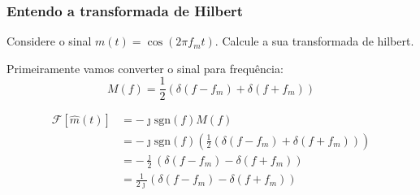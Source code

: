 \documentclass[10pt,hyperref={pdfpagemode=FullScreen},aspectratio=169]{beamer}
\begin{document}
\begin{frame}
  \frametitle{Entendo a transformada de Hilbert
  }
  Considere o sinal $m(t) = \cos \left(2\pi f_m t\right)$. Calcule a sua transformada de hilbert.

  Primeiramente vamos converter o sinal para frequência:
    $$
    M(f) = \frac{1}{2}\left(\delta (f - f_m) + \delta (f + f_m) \right)
    $$
  
    
    \begin{align*}
      \mathcal{F}[\hat{m}(t)] & = -\jmath \textrm{sgn}(f)M(f) \\
                              & = -\jmath \textrm{sgn}(f)\left(\frac{1}{2}\left(\delta (f - f_m) + \delta (f + f_m) \right)\right)\\
                              & = -\frac{\jmath}{2} \left( \delta (f - f_m)  -  \delta (f + f_m)  \right) \\
                              & =  \frac{1}{2\jmath} \left( \delta (f - f_m)  -  \delta (f + f_m)  \right)
    \end{align*}  
  

\end{frame}
\end{document}
